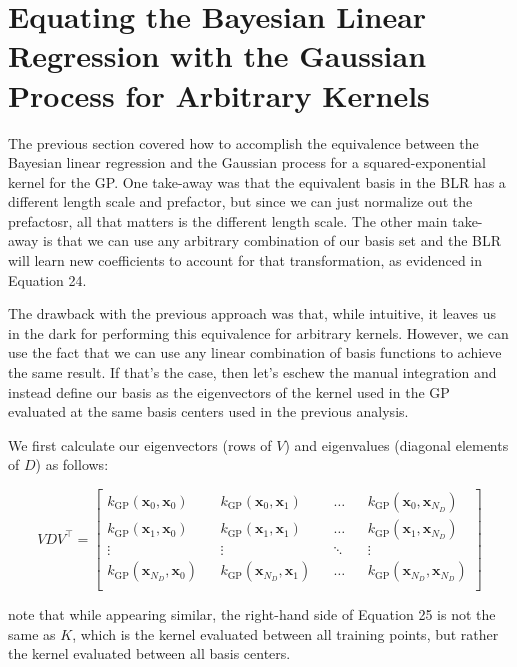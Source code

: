\documentclass{article}
\begin{document}
\section{Equating the Bayesian Linear Regression with the Gaussian Process for Arbitrary Kernels}

The previous section covered how to accomplish the equivalence between the Bayesian linear regression and the Gaussian process for a squared-exponential kernel for the GP. One take-away was that the equivalent basis in the BLR has a different length scale and prefactor, but since we can just normalize out the prefactosr, all that matters is the different length scale. The other main take-away is that we can use any arbitrary combination of our basis set and the BLR will learn new coefficients to account for that transformation, as evidenced in Equation 24.

The drawback with the previous approach was that, while intuitive, it leaves us in the dark for performing this equivalence for arbitrary kernels. However, we can use the fact that we can use any linear combination of basis functions to achieve the same result. If that's the case, then let's eschew the manual integration and instead define our basis as the eigenvectors of the kernel used in the GP evaluated at the same basis centers used in the previous analysis.

We first calculate our eigenvectors (rows of $V$) and eigenvalues (diagonal elements of $D$) as follows:

\begin{equation}
    VDV^\top = 
    \begin{bmatrix}
    k_\text{GP}(\mathbf{x}_0,\mathbf{x}_0) && k_\text{GP}(\mathbf{x}_0,\mathbf{x}_1) && \dots && k_\text{GP}(\mathbf{x}_0,\mathbf{x}_{N_D}) \\
    k_\text{GP}(\mathbf{x}_1,\mathbf{x}_0) && k_\text{GP}(\mathbf{x}_1,\mathbf{x}_1) && \dots && k_\text{GP}(\mathbf{x}_1,\mathbf{x}_{N_D}) \\
    \vdots && \vdots && \ddots && \vdots \\
    k_\text{GP}(\mathbf{x}_{N_D},\mathbf{x}_0) && k_\text{GP}(\mathbf{x}_{N_D},\mathbf{x}_1) && \dots && k_\text{GP}(\mathbf{x}_{N_D},\mathbf{x}_{N_D}) \\
    \end{bmatrix}
\end{equation}

note that while appearing similar, the right-hand side of Equation 25 is not the same as $K$, which is the kernel evaluated between all training points, but rather the kernel evaluated between all basis centers.
\end{document}
